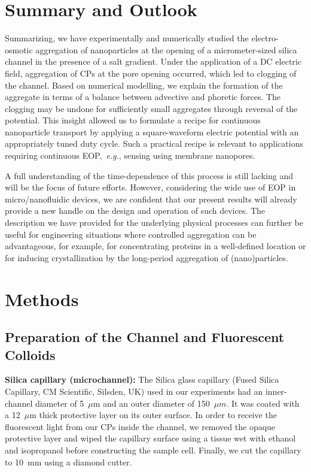 \documentclass[twoside,twocolumn,9pt]{article}
\begin{document}
\section*{Summary and Outlook}

Summarizing, we have experimentally and numerically studied the electro-osmotic aggregation of nanoparticles at the opening of a micrometer-sized silica channel in the presence of a salt gradient. Under the application of a DC electric field, aggregation of CPs at the pore opening occurred, which led to clogging of the channel. Based on numerical modelling, we explain the formation of the aggregate in terms of a balance between advective and phoretic forces. The clogging may be undone for sufficiently small aggregates through reversal of the potential. This insight allowed us to formulate a recipe for continuous nanoparticle transport by applying a square-waveform electric potential with an appropriately tuned duty cycle. Such a practical recipe is relevant to applications requiring continuous EOP,~\textit{e.g.}, sensing using membrane nanopores. 

A full understanding of the time-dependence of this process is still lacking and will be the focus of future efforts. 
However, considering the wide use of EOP in micro/nanofluidic devices, we are confident that our present results will already provide a new handle on the design and operation of such devices. The description we have provided for the underlying physical processes can further be useful for engineering situations where controlled aggregation can be advantageous, for example, for concentrating proteins in a well-defined location or for inducing crystallization by the long-period aggregation of (nano)particles. 

\section*{Methods}

\subsection*{Preparation of the Channel and Fluorescent Colloids}

\textbf{Silica capillary (microchannel):} The Silica glass capillary (Fused Silica Capillary, CM Scientific, Silsden, UK) used in our experiments had an inner-channel diameter of 5~$\mu$m and an outer diameter of 150~$\mu m$. It was coated with a 12~$\mu$m thick protective layer on its outer surface. In order to receive the fluorescent light from our CPs inside the channel, we removed the opaque protective layer and wiped the capillary surface using a tissue wet with ethanol and isopropanol before constructing the sample cell. Finally, we cut the capillary to 10~mm using a diamond cutter.
\end{document}

